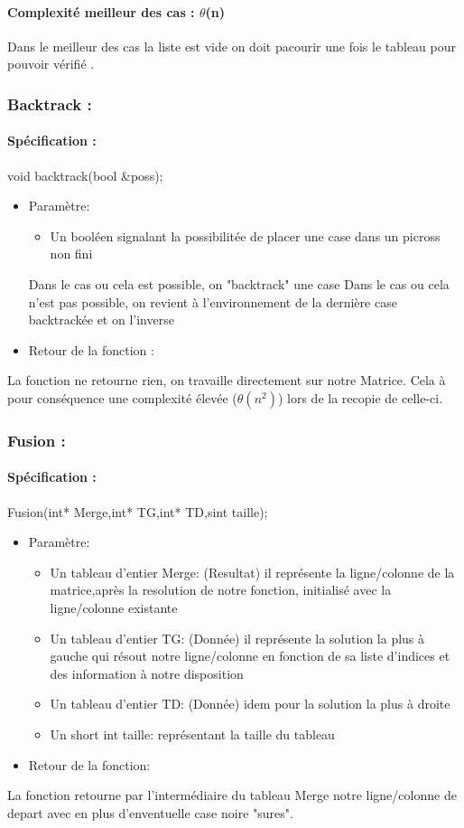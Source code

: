 \documentclass{article}
\begin{document}
\paragraph{Complexit\'e meilleur des cas : $\theta$(n)\newline}
Dans le meilleur des cas la liste est vide on doit pacourir une fois le tableau pour pouvoir v\'erifi\'e .
\subsubsection{Backtrack :}
\paragraph{Sp\'ecification :}
 void backtrack(bool \&poss);
\begin{itemize}
\item Param\`etre:
\begin{itemize}
\item Un bool\'een signalant la possibilit\'ee de placer une case dans un picross non fini
\end{itemize}
Dans le cas ou cela est possible, on "backtrack" une case
Dans le cas ou cela n'est pas possible, on revient \`a l'environnement de la derni\`ere case backtrack\'ee et on l'inverse
\item Retour de la fonction :
\end{itemize}
La fonction ne retourne rien, on travaille directement sur notre Matrice.\newline
Cela \`a pour cons\'equence une complexit\'e \'elev\'ee ($\theta(n^2)$) lors de la recopie de celle-ci.
\subsubsection{Fusion :}
\paragraph{Sp\'ecification :}Fusion(int* Merge,int* TG,int* TD,sint taille);
\begin{itemize}
\item Param\`etre:
\begin{itemize}
\item Un tableau d'entier Merge: (Resultat) il repr\'esente la ligne/colonne de la matrice,apr\`es la resolution de notre fonction, initialis\'e avec la ligne/colonne existante
\item Un tableau d'entier TG: (Donn\'ee) il repr\'esente la solution la plus \`a gauche qui r\'esout notre ligne/colonne en fonction de sa liste d'indices et des information \`a notre disposition
\item Un tableau d'entier TD: (Donn\'ee) idem pour la solution la plus \`a droite
\item Un short int taille: repr\'esentant la taille du tableau
\end{itemize}
\item Retour de la fonction:
\end{itemize}
La fonction retourne par l'interm\'ediaire du tableau Merge notre ligne/colonne de depart avec en plus d'enventuelle case noire "sures".
\end{document}
